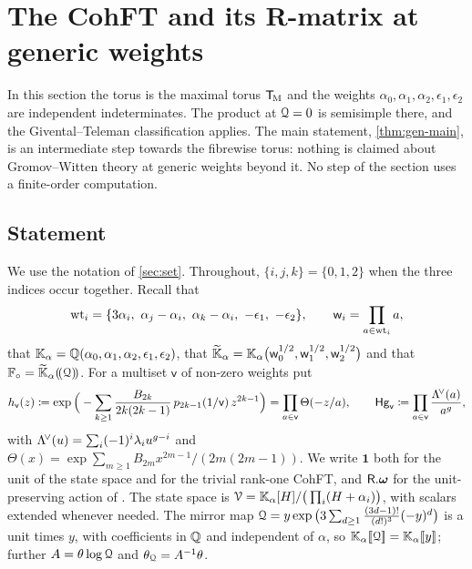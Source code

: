 \newcommand{\gendbr}[1]{\langle\!\langle #1 \rangle\!\rangle}  %
\newcommand{\genC}{\mathsf{C}}                                 %
\newcommand{\genone}{\mathbf{1}}                               %
\newcommand{\genst}{\mathrm{st}}                               %
\newcommand{\genev}{\mathrm{ev}}
\newcommand{\genft}{\mathrm{ft}}
\newcommand{\genCurve}{\mathcal{C}}                            %
\newcommand{\genbR}{\boldsymbol{\mathsf{R}}}                   %
\section{The CohFT and its R-matrix at generic weights}
\label{sec:gen}

In this section the torus is the maximal torus $\mathsf{T}_{\!\mathrm{M}}$ and the weights $\alpha_0,\alpha_1,\alpha_2,\epsilon_1,\epsilon_2$ are independent indeterminates. The product at $\mathcal{Q}=0$ is semisimple there, and the Givental--Teleman classification applies. The main statement, \cref{thm:gen-main}, is an intermediate step towards the fibrewise torus: nothing is claimed about Gromov--Witten theory at generic weights beyond it. No step of the section uses a finite-order computation.

\subsection{Statement}

We use the notation of \cref{sec:set}. Throughout, $\{i,j,k\}=\{0,1,2\}$ when the three indices occur together. Recall that
\[
\wts_i=\{3\alpha_i,\ \alpha_j-\alpha_i,\ \alpha_k-\alpha_i,\ -\epsilon_1,\ -\epsilon_2\},\qquad \wprod_i=\prod_{a\in\wts_i}a,
\]
that $\mathbb{K}_{\alpha}=\mathbb{Q}(\alpha_0,\alpha_1,\alpha_2,\epsilon_1,\epsilon_2)$, that $\widetilde{\mathbb{K}}_{\alpha}=\mathbb{K}_{\alpha}\big(\mathsf{w}_0^{1/2},\mathsf{w}_1^{1/2},\mathsf{w}_2^{1/2}\big)$ and that $\mathbb{F}_{\circ}=\widetilde{\mathbb{K}}_{\alpha}(\!(\mathcal{Q})\!)$. For a multiset $\mathsf{v}$ of non-zero weights put
\[
h_{\mathsf{v}}(z)\coloneqq\exp\Big(-\sum_{k\geq 1}\frac{B_{2k}}{2k(2k-1)}\,p_{2k-1}(1/\mathsf{v})\,z^{2k-1}\Big)=\prod_{a\in\mathsf{v}}\Theta(-z/a),\qquad
\mathsf{Hg}_{\mathsf{v}}\coloneqq\prod_{a\in\mathsf{v}}\frac{\Lambda^{\!\vee}(a)}{a^{g}},
\]
with $\Lambda^{\!\vee}(u)=\sum_i(-1)^i\lambda_i u^{g-i}$ and $\Theta(x)=\exp\sum_{m\geq 1}B_{2m}x^{2m-1}/(2m(2m-1))$. We write $\genone$ both for the unit of the state space and for the trivial rank-one CohFT, and $\mathsf{R}.\boldsymbol{\omega}$ for the unit-preserving action of \cite[Definition 2.13]{PPZ15}. The state space is $\mathcal{V}=\mathbb{K}_{\alpha}[H]/\big(\prod_i(H+\alpha_i)\big)$, with scalars extended whenever needed. The mirror map $\mathcal{Q}=y\exp\big(3\sum_{d\geq1}\frac{(3d-1)!}{(d!)^3}(-y)^d\big)$ is a unit times $y$, with coefficients in $\mathbb{Q}$ and independent of $\alpha$, so $\mathbb{K}_{\alpha}[\![ \mathcal{Q} ]\!]=\mathbb{K}_{\alpha}[\![ y ]\!]$; further $A=\theta\log\mathcal{Q}$ and $\theta_{\mathcal{Q}}=A^{-1}\theta$.

